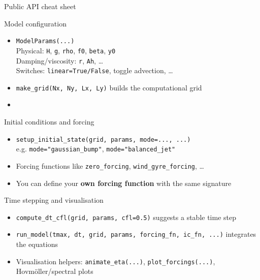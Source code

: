 \documentclass[]{beamer}
\begin{document}
\begin{frame}[shrink=8]{Public API cheat sheet}
  \begin{block}{Model configuration}
    \begin{itemize}
      \item \texttt{ModelParams(...)}\\
        Physical: \texttt{H}, \texttt{g}, \texttt{rho}, \texttt{f0}, \texttt{beta}, \texttt{y0}\\
        Damping/viscosity: \texttt{r}, \texttt{Ah}, \dots\\
        Switches: \texttt{linear=True/False}, toggle advection, \dots
      \item \texttt{make\_grid(Nx, Ny, Lx, Ly)} builds the computational grid
    \item[]
    \end{itemize}
  \end{block}
  \begin{block}{Initial conditions and forcing}
    \begin{itemize}
      \item \texttt{setup\_initial\_state(grid, params, mode=..., ...)}\\
        e.g. \texttt{mode="gaussian\_bump"}, \texttt{mode="balanced\_jet"}
      \item Forcing functions like \texttt{zero\_forcing}, \texttt{wind\_gyre\_forcing}, \dots
      \item You can define your \textbf{own forcing function} with the same signature
    \end{itemize}
  \end{block}
  \begin{block}{Time stepping and visualisation}
    \begin{itemize}
      \item \texttt{compute\_dt\_cfl(grid, params, cfl=0.5)} suggests a stable time step
      \item \texttt{run\_model(tmax, dt, grid, params, forcing\_fn, ic\_fn, ...)} integrates the equations
      \item Visualisation helpers: \texttt{animate\_eta(...)}, \texttt{plot\_forcings(...)}, Hovmöller/spectral plots
    \end{itemize}
  \end{block}
\end{frame}
\end{document}
